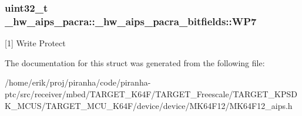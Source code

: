 \subsubsection[{\texorpdfstring{W\+P7}{WP7}}]{\setlength{\rightskip}{0pt plus 5cm}uint32\+\_\+t \+\_\+hw\+\_\+aips\+\_\+pacra\+::\+\_\+hw\+\_\+aips\+\_\+pacra\+\_\+bitfields\+::\+W\+P7}\hypertarget{struct__hw__aips__pacra_1_1__hw__aips__pacra__bitfields_a1148ff58fd781f41590b0b40c1bbbb7c}{}\label{struct__hw__aips__pacra_1_1__hw__aips__pacra__bitfields_a1148ff58fd781f41590b0b40c1bbbb7c}
\mbox{[}1\mbox{]} Write Protect 

The documentation for this struct was generated from the following file\+:\begin{DoxyCompactItemize}
\item 
/home/erik/proj/piranha/code/piranha-\/ptc/src/receiver/mbed/\+T\+A\+R\+G\+E\+T\+\_\+\+K64\+F/\+T\+A\+R\+G\+E\+T\+\_\+\+Freescale/\+T\+A\+R\+G\+E\+T\+\_\+\+K\+P\+S\+D\+K\+\_\+\+M\+C\+U\+S/\+T\+A\+R\+G\+E\+T\+\_\+\+M\+C\+U\+\_\+\+K64\+F/device/device/\+M\+K64\+F12/M\+K64\+F12\+\_\+aips.\+h\end{DoxyCompactItemize}
